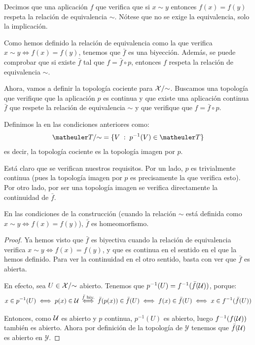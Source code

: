 Decimos que una aplicación $f$ que verifica que si $x\sim y$ entonces $f(x)=f(y)$ respeta la relación de equivalencia $\mathord{\sim}$. Nótese que no se exige la equivalencia, solo la implicación.

Como hemos definido la relación de equivalencia como la que verifica $x\sim y\iff f(x)=f(y)$, tenemos que $\bar{f}$ es una biyección. Además, se puede comprobar que si existe $\bar{f}$ tal que $f=\bar{f}\circ p$, entonces $f$ respeta la relación de equivalencia $\mathord{\sim}$.

Ahora, vamos a definir la topología cociente para $\mathcal{X}/\mathord{\sim}$. Buscamos una topología que verifique que la aplicación $p$ es continua y que existe una aplicación continua $\bar{f}$ que respete la relación de equivalencia $\mathord{\sim}$ y que verifique que $f=\bar{f}\circ p$.

\begin{defi}
	Definimos la  en las condiciones anteriores como:
	\[\T/\mathord{\sim} = \{V\midc p^{-1}(V)\in\T\}\]
	es decir, la topología cociente es la topología imagen por $p$.
\end{defi}

Está claro que se verifican nuestros requisitos. Por un lado, $p$ es trivialmente continua (pues la topología imagen por $p$ es precisamente la que verifica esto). Por otro lado, por ser una topología imagen se verifica directamente la continuidad de $\bar{f}$.

\begin{prop}
	En las condiciones de la construcción (cuando la relación $\sim$ está definida como $x\sim y\iff f(x)=f(y)$), $\bar{f}$ es homeomorfismo.
	
	\begin{proof}
		Ya hemos visto que $\bar{f}$ es biyectiva cuando la relación de equivalencia verifica $x\sim y\iff f(x)=f(y)$, y que es continua en el sentido en el que la hemos definido. Para ver la continuidad en el otro sentido, basta con ver que $\bar{f}$ es abierta.
		
		En efecto, sea $U\in \mathcal{X}/\mathord{\sim}$ abierto. Tenemos que $p^{-1}(U)=f^{-1}(\bar{f}(\mathcal{U}))$, porque:
		\[x\in p^{-1}(U)\iff p(x)\in \mathcal{U}\stackrel{\bar{f}\text{ biy.}}{\iff}\bar{f}(p(x))\in \bar{f}(U)\iff f(x)\in\bar{f}(U)\iff x\in f^{-1}(\bar{f}(U))\]
		
		Entonces, como $\mathcal{U}$ es abierto y $p$ continua, $p^{-1}(U)$ es abierto, luego $f^{-1}(f(\mathcal{U}))$ también es abierto. Ahora por definición de la topología de $\mathcal{Y}$ tenemos que $\bar{f}(\mathcal{U})$ es abierto en $\mathcal{Y}$.
		
	\end{proof}
\end{prop}

